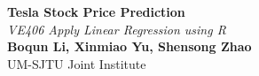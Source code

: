 \documentclass[a0,portrait]{a0poster}
\begin{document}


\begin{minipage}[b]{0.75\linewidth}
\VeryHuge \color{NavyBlue} \textbf{Tesla Stock Price Prediction} \color{Black}\\[0.5cm] %
\Huge\textit{VE406 Apply Linear Regression using R}\\[2.4cm] %
\huge \textbf{Boqun Li, Xinmiao Yu, Shensong Zhao}\\[0.5cm] %
\huge  UM-SJTU Joint Institute\\[0.4cm] %
\end{minipage}

\vspace{1cm} %

\end{document}
